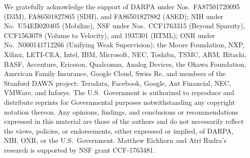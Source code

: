 We gratefully acknowledge the support of DARPA under Nos.\ FA87501720095 (D3M), FA86501827865 (SDH), and FA86501827882 (ASED); NIH under No.\ U54EB020405 (Mobilize), NSF under Nos.\ CCF1763315 (Beyond Sparsity), CCF1563078 (Volume to Velocity), and 1937301 (RTML); ONR under No.\ N000141712266 (Unifying Weak Supervision); the Moore Foundation, NXP, Xilinx, LETI-CEA, Intel, IBM, Microsoft, NEC, Toshiba, TSMC, ARM, Hitachi, BASF, Accenture, Ericsson, Qualcomm, Analog Devices, the Okawa Foundation, American Family Insurance, Google Cloud, Swiss Re, and members of the Stanford DAWN project: Teradata, Facebook, Google, Ant Financial, NEC, VMWare, and Infosys. The U.S.\ Government is authorized to reproduce and distribute reprints for Governmental purposes notwithstanding any copyright notation thereon. Any opinions, findings, and conclusions or recommendations expressed in this material are those of the authors and do not necessarily reflect the views, policies, or endorsements, either expressed or implied, of DARPA, NIH, ONR, or the U.S.\ Government. Matthew Eichhorn and Atri Rudra’s research is supported by NSF grant CCF-1763481.


